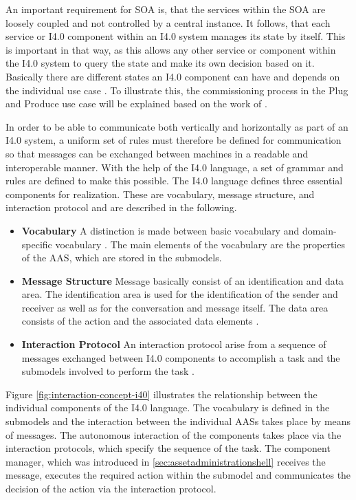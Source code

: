 An important requirement for \ac{SOA} is, that the services within the \ac{SOA} are loosely coupled and not controlled by a central instance. It follows, that each service or \ac{I4.0} component within an \ac{I4.0} system manages its state by itself. This is important in that way, as this allows any other service or component within the \ac{I4.0} system to query the state and make its own decision based on it. Basically there are different states an \ac{I4.0} component can have and depends on the individual use case \cite[p. 30]{Epple2018BaSysAufbaus}. To illustrate this, the commissioning process in the Plug and Produce use case will be explained based on the work of \citeauthor{Schweizer2021ProcessSystems}.   

In order to be able to communicate both vertically and horizontally as part of an I4.0 system, a uniform set of rules must therefore be defined for communication so that messages can be exchanged between machines in a readable and interoperable manner. With the help of the \ac{I4.0} language, a set of grammar and rules are defined to make this possible. The \ac{I4.0} language defines three essential components for realization. These are vocabulary, message structure, and interaction protocol \cite[p. 12, figure 8]{Bock2016Weiterentwicklung4.0-Komponenten} and are described in the following.

\begin{itemize}
    \item [] \textbf{Vocabulary} A distinction is made between basic vocabulary and domain-specific vocabulary \cite[p. 12]{Bock2016Weiterentwicklung4.0-Komponenten}. The main elements of the vocabulary are the properties of the \ac{AAS}, which are stored in the submodels.
    \item [] \textbf{Message Structure} Message basically consist of an identification and data area. The identification area is used for the identification of the sender and receiver as well as for the conversation and message itself. The data area consists of the action and the associated data elements \cite[p. 17]{Bock2016Weiterentwicklung4.0-Komponenten}.
    \item [] \textbf{Interaction Protocol} An interaction protocol arise from a sequence of messages exchanged between \ac{I4.0} components to accomplish a task and the submodels involved to perform the task \cite[p. 13]{Bock2016Weiterentwicklung4.0-Komponenten}.
\end{itemize}

Figure \ref{fig:interaction-concept-i40} illustrates the relationship between the individual components of the \ac{I4.0} language. The vocabulary is defined in the submodels and the interaction between the individual \ac{AAS}s takes place by means of messages. The autonomous interaction of the components takes place via the interaction protocols, which specify the sequence of the task. The component manager, which was introduced in \ref{sec:assetadministrationshell} receives the message, executes the required action within the submodel and communicates the decision of the action via the interaction protocol.

